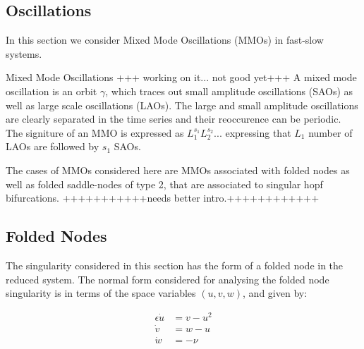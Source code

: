 \subsection{Oscillations}\label{sec: MMO Oscilaltions} %
In this section we consider Mixed Mode Oscillations (MMOs) in fast-slow systems.

\begin{definition}{Mixed Mode Oscillations}
	+++ working on it... not good yet+++
	A mixed mode oscillation is an orbit $\gamma$, which traces out small amplitude oscillations (SAOs) as well as large scale oscillations (LAOs).
	The large and small amplitude oscillations are clearly separated in the time series and their reoccurence can be periodic.
	The signiture of an MMO is expressed as $L_1^{s_1}L_2^{s_2}...$ expressing that $L_1$ number of LAOs are followed by $s_1$ SAOs.
\end{definition}

The cases of MMOs considered here are MMOs associated with folded nodes as well as folded saddle-nodes of type 2, that are associated to singular hopf bifurcations.
+++++++++++needs better intro.++++++++++++

\subsection{ Folded Nodes}
The singularity considered in this section has the form of a folded node in the reduced system.
The normal form considered for analysing the folded node singularity is in terms of the space variables $(u,v,w)$, and given by:

\begin{align*}
\epsilon \dot{u} &= v - u^2\\
\dot{v} &= w-u\\
\dot{w} &= - \nu
\end{align*}

